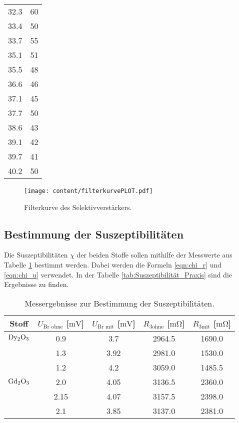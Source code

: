 \begin{table}
\begin{tabular}{c c}
      32.3   & 60 \\
      33.4   & 50 \\
      33.7   & 55 \\
      35.1   & 51 \\
      35.5   & 48 \\
      36.6   & 46 \\
      37.1   & 45 \\
      37.7   & 50 \\
      38.6   & 43 \\
      39.1   & 42 \\
      39.7   & 41 \\
      40.2   & 50 \\
    \bottomrule
  \end{tabular}
\end{table}

\begin{figure}
  \centering
  \caption{Filterkurve des Selektivverstärkers.}
  \label{fig:filterkurvePLOT}
  \texttt{[image: content/filterkurvePLOT.pdf]}
\end{figure}

\subsection{Bestimmung der Suszeptibilitäten}
\label{subsec:Suszeptibilität}

Die Suszeptibilitäten $\chi$ der beiden Stoffe sollen mithilfe der Messwerte aus Tabelle \ref{tab:Messwerte} bestimmt werden.
Dabei werden die Formeln \eqref{eqn:chi_r} und \eqref{eqn:chi_u} verwendet.
In der Tabelle \ref{tab:Suszeptibilität_Praxis} sind die Ergebnisse zu finden.

\begin{table}
  \centering
  \caption{Messergebnisse zur Bestimmung der Suszeptibilitäten.}
  \label{tab:Messwerte}
  \begin{tabular}{c c c c c}
    \toprule
    {Stoff} & {$U_{\text{Br ohne}}$ [$\si{\milli\volt}$]} & {$U_{\text{Br mit}}$ [$\si{\milli\volt}$]} & {$R_{3 \text{ohne}}$ [$\si{\milli\ohm}$]} &{$R_{3 \text{mit}}$ [$\si{\milli\ohm}$]}\\
    \midrule
    $\ce{Dy2O3}$ & 0.9 & 3.7 & 2964.5 & 1690.0\\
              &1.3 & 3.92 & 2981.0 & 1530.0\\
              &1.2 & 4.2 & 3059.0 & 1485.5 \\
    $\ce{Gd2O3}$ &2.0 & 4.05 & 3136.5 & 2360.0 \\
              &2.15 & 4.07 & 3157.5 & 2398.0 \\
              &2.1 & 3.85 & 3137.0 & 2381.0 \\
    \bottomrule
  \end{tabular}
\end{table}

